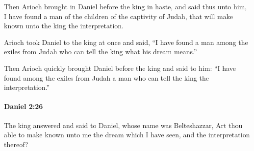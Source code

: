 			\begin{versebox}
					\item[BHS] 
					\item[LXX] 
					\item[ASV] Then Arioch brought in Daniel before the king in haste, and said thus unto him, I have found a man of the children of the captivity of Judah, that will make known unto the king the interpretation.
					\item[NIV] Arioch took Daniel to the king at once and said, “I have found a man among the exiles from Judah who can tell the king what his dream means.”
					\item[NRSV] Then Arioch quickly brought Daniel before the king and said to him: “I have found among the exiles from Judah a man who can tell the king the interpretation.”
			\end{versebox}

		\paragraph{Daniel 2:26} %
			\label{DANIEL-2-26}

			The king answered and said to Daniel, whose name was Belteshazzar, Art thou able to make known unto me the dream which I have seen, and the interpretation thereof?

